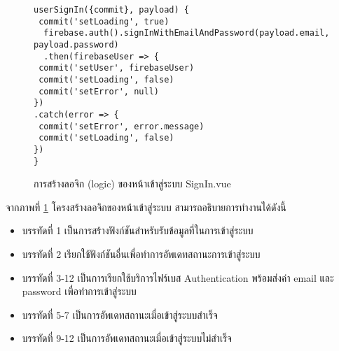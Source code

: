	\begin{figure}[H]
		{\begin{lstlisting}
userSignIn({commit}, payload) {
 commit('setLoading', true)
  firebase.auth().signInWithEmailAndPassword(payload.email, payload.password)
  .then(firebaseUser => {
 commit('setUser', firebaseUser)
 commit('setLoading', false)
 commit('setError', null)
})
.catch(error => {
 commit('setError', error.message)
 commit('setLoading', false)
})
}
			\end{lstlisting}}
		\caption{การสร้างลอจิก (logic) ของหน้าเข้าสู่ระบบ SignIn.vue}
		\label{Fig:SignInJs}
	\end{figure}
	จากภาพที่ \ref{Fig:SignInJs} โครงสร้างลอจิกของหน้าเข้าสู่ระบบ สามารถอธิบายการทำงานได้ดังนี้
	\begin{itemize}[label={--}]
		\item บรรทัดที่ 1  เป็นการสร้างฟังก์ชันสำหรับรับข้อมูลที่ในการเข้าสู่ระบบ
		\item บรรทัดที่ 2 เรียกใช้ฟังก์ชันอื่นเพื่อทำการอัพเดทสถานะการเข้าสู่ระบบ
		\item บรรทัดที่ 3-12 เป็นการเรียกใช้บริการไฟร์เบส Authentication พร้อมส่งค่า email และ password เพื่อทำการเข้าสู่ระบบ
		\item บรรทัดที่ 5-7 เป็นการอัพเดทสถานะเมื่อเข้าสู่ระบบสำเร็จ
		\item บรรทัดที่ 9-12 เป็นการอัพเดทสถานะเมื่อเข้าสู่ระบบไม่สำเร็จ 
	\end{itemize}
	
